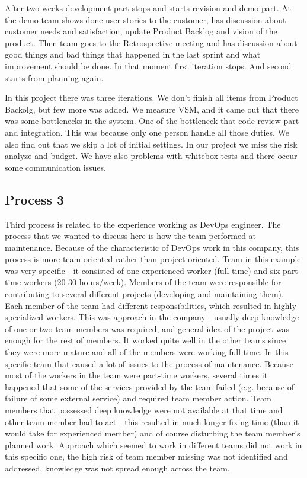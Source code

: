 After two weeks development part stops and starts revision and demo part. At the demo team shows done user stories to the customer, has discussion about customer needs and satisfaction, update Product Backlog and vision of the product. Then team goes to the Retrospective meeting and has discussion about good things and bad things that happened in the last sprint and what improvement should be done. In that moment first iteration stops. And second starts from planning again.

In this project there was three iterations. We don't finish all items from Product Backolg, but few more was added. We measure VSM, and it came out that there was some bottlenecks in the system. One of the bottleneck that code review part and integration. This was because only one person handle all those duties. We also find out that we skip a lot of initial settings. In our project we miss the risk analyze and budget. We have also problems with whitebox tests and there occur some communication issues.

\subsection*{Process 3}

Third process is related to the experience working as DevOps engineer. The process that we wanted to discuss here is how the team performed at maintenance. Because of the characteristic of DevOps work in this company, this process is more team-oriented rather than project-oriented. Team in this example was very specific - it consisted of one experienced worker (full-time) and six part-time workers (20-30 hours/week). Members of the team were responsible for contributing to several different projects (developing and maintaining them). Each member of the team had different responsibilities, which resulted in highly-specialized workers. This was approach in the company - usually deep knowledge of one or two team members was required, and general idea of the project was enough for the rest of members. It worked quite well in the other teams since they were more mature and all of the members were working full-time. In this specific team that caused a lot of issues to the process of maintenance. Because most of the workers in the team were part-time workers, several times it happened that some of the services provided by the team failed (e.g. because of failure of some external service) and required team member action. Team members that possessed deep knowledge were not available at that time and other team member had to act - this resulted in much longer fixing time (than it would take for experienced member) and of course disturbing the team member's planned work. Approach which seemed to work in different teams did not work in this specific one, the high risk of team member missing was not identified and addressed, knowledge was not spread enough across the team.
